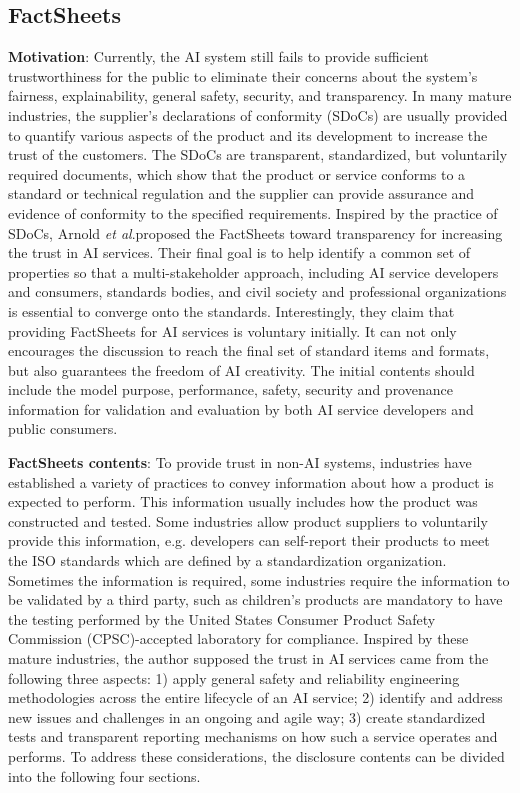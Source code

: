 \documentclass[conference]{IEEEtran}
\newcommand{\etal}{\textit{et al}.}
\begin{document}
\subsection{FactSheets\cite{b2}}
\textbf{Motivation}:
Currently, the AI system still fails to provide sufficient trustworthiness for the public to eliminate their concerns about the system's fairness, explainability, general safety, security, and transparency. 
In many mature industries, the supplier's declarations of conformity (SDoCs) are usually provided to quantify various aspects of the product and its development to increase the trust of the customers.  
The SDoCs are transparent, standardized, but voluntarily required documents, which show that the product or service conforms to a standard or technical regulation and the supplier can provide assurance and evidence of conformity to the specified requirements. 
Inspired by the practice of SDoCs, Arnold \etal proposed the FactSheets toward transparency for increasing the trust in AI services. 
Their final goal is to help identify a common set of properties so that a multi-stakeholder approach, including AI service developers and consumers, standards bodies, and civil society and professional organizations is essential to converge onto the standards. 
Interestingly, they claim that providing FactSheets for AI services is voluntary initially. It can not only encourages the discussion to reach the final set of standard items and formats, but also guarantees the freedom of AI creativity. 
The initial contents should include the model purpose, performance, safety, security and provenance information for validation and evaluation by both AI service developers and public consumers.

\textbf{FactSheets contents}: 
To provide trust in non-AI systems, industries have established a variety of practices to convey information about how a product is expected to perform. 
This information usually includes how the product was constructed and tested.
Some industries allow product suppliers to voluntarily provide this information, e.g. developers can self-report their products to meet the ISO standards which are defined by a standardization organization. 
Sometimes the information is required, some industries require the information to be validated by a third party, such as children's products are mandatory to have the testing performed by the United States Consumer Product Safety Commission (CPSC)-accepted laboratory for compliance. 
Inspired by these mature industries, the author supposed the trust in AI services came from the following three aspects: 1) apply general safety and reliability engineering methodologies across the entire lifecycle of an AI service; 
2) identify and address new issues and challenges in an ongoing and agile way; 
3) create standardized tests and transparent reporting mechanisms on how such a service operates and performs.
To address these considerations, the disclosure contents can be divided into the following four sections.
\end{document}
